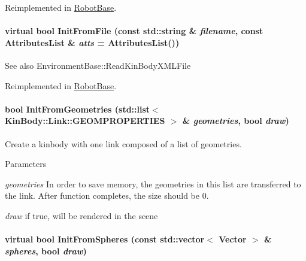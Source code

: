 Reimplemented in \hyperlink{classOpenRAVE_1_1RobotBase_a3f81f529c6959894555ad8841a134431}{RobotBase}.

\hypertarget{classOpenRAVE_1_1KinBody_ae67a1ee5e11749340bfbca5bd6749424}{
\paragraph[{InitFromFile}]{\setlength{\rightskip}{0pt plus 5cm}virtual bool InitFromFile (const std::string \& {\em filename}, \/  const AttributesList \& {\em atts} = {\ttfamily AttributesList()})}\hfill}
\label{classOpenRAVE_1_1KinBody_ae67a1ee5e11749340bfbca5bd6749424}
\begin{DoxySeeAlso}{See also}
EnvironmentBase::ReadKinBodyXMLFile 
\end{DoxySeeAlso}


Reimplemented in \hyperlink{classOpenRAVE_1_1RobotBase_ae67a1ee5e11749340bfbca5bd6749424}{RobotBase}.

\hypertarget{classOpenRAVE_1_1KinBody_ab0b57544b54f5b7d766a3fee473667a5}{
\paragraph[{InitFromGeometries}]{\setlength{\rightskip}{0pt plus 5cm}bool InitFromGeometries (std::list$<$ {\bf KinBody::Link::GEOMPROPERTIES} $>$ \& {\em geometries}, \/  bool {\em draw})}\hfill}
\label{classOpenRAVE_1_1KinBody_ab0b57544b54f5b7d766a3fee473667a5}


Create a kinbody with one link composed of a list of geometries. 


\begin{DoxyParams}{Parameters}
\item[{\em geometries}]In order to save memory, the geometries in this list are transferred to the link. After function completes, the size should be 0. \item[{\em draw}]if true, will be rendered in the scene \end{DoxyParams}
\hypertarget{classOpenRAVE_1_1KinBody_afe077907e74b0a8c7bdb53abc6a67fb1}{
\paragraph[{InitFromSpheres}]{\setlength{\rightskip}{0pt plus 5cm}virtual bool InitFromSpheres (const std::vector$<$ Vector $>$ \& {\em spheres}, \/  bool {\em draw})}\hfill}
\label{classOpenRAVE_1_1KinBody_afe077907e74b0a8c7bdb53abc6a67fb1}


